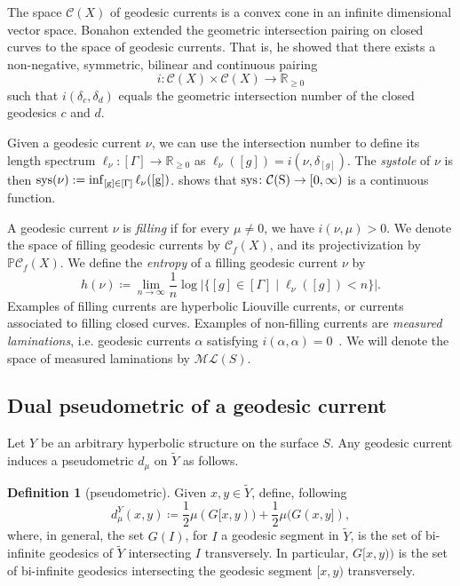 \documentclass[12pt]{amsart}
\numberwithin{equation}{section}
\numberwithin{figure}{section}
\theoremstyle{definition}
\newtheorem{definition}[equation]{Definition}
\theoremstyle{plain}
\newcommand*{\wt}[1]{\widetilde{#1}}
\newcommand{\cal}[1]{\mathcal{#1}}
\newcommand{\bb}[1]{\mathbb{#1}}
\begin{document}
The space $\cal C(X)$ of geodesic currents is a convex cone in an infinite dimensional vector space. Bonahon \cite{Bonahon86:EndsHyperbolicManifolds} extended the geometric intersection pairing on closed curves to the space of geodesic currents. That is, he showed that there exists a non-negative, symmetric, bilinear and continuous pairing
\[
i\colon \cal C(X)\times\cal C(X)\to \bb R_{\geq 0}
\]
such that $i(\delta_c,\delta_d)$ equals the geometric intersection number of the closed geodesics $c$ and $d$.

Given a geodesic current $\nu$, we can use the intersection number to define its length spectrum $\ell_\nu\colon[\Gamma]\to\bb R_{\geq 0}$ as $\ell_\nu([g])=i(\nu,\delta_{[g]})$. The \emph{systole} of $\nu$ is then $
\rm{sys}(\nu):=\inf_{[g]\in[\Gamma]}\ell_\nu([g])$.
 \cite[Corollary~1.5]{BIPP21:Currents} shows that $\rm{sys}\colon\cal C(S)\to[0,\infty)$ is a continuous function. 

A geodesic current $\nu$ is {\em filling} if for every $\mu \neq 0$, we have $i(\nu, \mu) >0$. We denote the space of filling geodesic currents by $\cal C_f(X)$, and its projectivization by $\mathbb{P}\cal C_f(X)$.
We define the  \emph{entropy} of a filling geodesic current $\nu$ by
\begin{equation}
h(\nu)\coloneqq \lim_{n\to \infty}\frac{1}{n}\log |\{[g]\in[\Gamma]\mid \ell_{\nu}([g])<n\}|.
\label{eq:entropy_mu}
\end{equation}
Examples of filling currents are hyperbolic Liouville currents, or currents associated to filling closed curves.
Examples of non-filling currents are \emph{measured laminations}, i.e. geodesic currents $\alpha$ satisfying $i(\alpha,\alpha)=0$~\cite[Proposition~14]{Bonahon88:GeodesicCurrent}.
We will denote the space of measured laminations by $\mathcal{ML}(S)$.

\subsection{Dual pseudometric of a geodesic current}
\label{subsec:dual_current}
Let $Y$ be an arbitrary hyperbolic structure on the surface $S$.
Any geodesic current induces a pseudometric $d_{\mu}$ on $\wt{Y}$ as follows.


\begin{definition}[pseudometric]\label{def:current_pseudo} Given $x,y \in \wt{Y}$, define, following~\cite[Section~4]{BIPP21:Currents}
\[
d_{\mu}^Y(x,y) \coloneqq \frac{1}{2}\mu(G[x,y)) + \frac{1}{2}\mu(G(x,y]),
\]
where, in general, the set $G(I)$, for $I$ a geodesic segment in $\wt{Y}$, is the set of bi-infinite geodesics of $\wt{Y}$ intersecting $I$ transversely. In particular, $G[x,y))$ is the set of bi-infinite geodesics intersecting the geodesic segment $[x,y)$ transversely.  
\end{definition}
\end{document}
